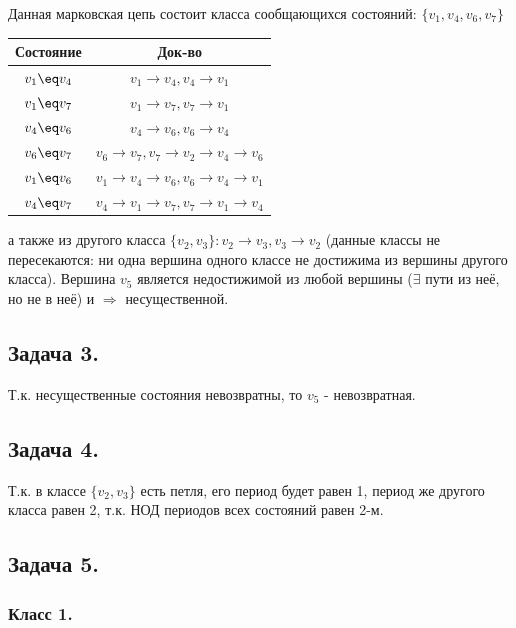 Данная марковская цепь состоит класса сообщающихся состояний: $\{ v_1, v_4, v_6, v_7 \}$
\begin{table}[H]
	\centering
	\begin{tabular}{|c|c|}
		\hline
		\textbf{Состояние} & \textbf{Док-во}                            \\ \hline
		$v_1 \eq v_4$      & $v_1 \to v_4, v_4 \to v_1$                 \\ \hline
		$v_1 \eq v_7$      & $v_1 \to v_7, v_7 \to v_1$                 \\ \hline
		$v_4 \eq v_6$      & $v_4 \to v_6, v_6 \to v_4$                 \\ \hline
		$v_6 \eq v_7$      & $v_6 \to v_7, v_7 \to v_2 \to v_4 \to v_6$ \\ \hline
		$v_1 \eq v_6$      & $v_1 \to v_4 \to v_6, v_6 \to v_4 \to v_1$ \\ \hline
		$v_4 \eq v_7$      & $v_4 \to v_1 \to v_7, v_7 \to v_1 \to v_4$ \\ \hline
	\end{tabular}
\end{table}
а также из другого класса $\{ v_2, v_3 \}: v_2 \to v_3, v_3 \to v_2$ (данные классы не пересекаются: ни одна вершина одного классе не достижима из вершины другого класса). Вершина $v_5$ является недостижимой из любой вершины ($\exists$ пути из неё, но не в неё) и $\Rightarrow$ несущественной.

\subsection*{Задача 3.}

Т.к. несущественные состояния невозвратны, то $v_5$ - невозвратная.

\subsection*{Задача 4.}

Т.к. в классе $\{ v_2, v_3 \}$ есть петля, его период будет равен 1, период же другого класса равен 2, т.к. НОД периодов всех состояний равен 2-м.

\subsection*{Задача 5.}

\subsubsection*{Класс 1.}

